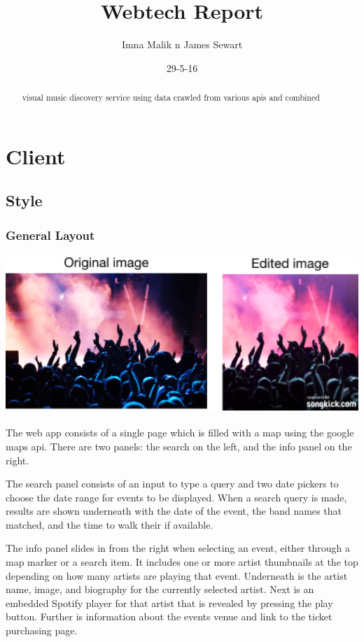 \documentclass[10pt]{article}
\title{Webtech Report}
\author{Imna Malik n James Sewart}
\date{29-5-16}
\begin{document}
    \maketitle

    \tableofcontents


    \begin{abstract}
        visual music discovery service using data crawled from various apis and combined
    \end{abstract}

    \section{Client}
        \subsection{Style}
            \subsubsection{General Layout}
                \includegraphics[height=60mm]{example2.png}

                The web app consists of a single page which is filled with a map using the google maps api. There are two panels: the search on the left, and the info panel on the right. 

                The search panel consists of an input to type a query and two date pickers to choose the date range for events to be displayed. When a search query is made, results are shown underneath with the date of the event, the band names that matched, and the time to walk their if available.

                The info panel slides in from the right when selecting an event, either through a map marker or a search item. It includes one or more artist thumbnails at the top depending on how many artists are playing that event. Underneath is the artist name, image, and biography for the currently selected artist. Next is an embedded Spotify player for that artist that is revealed by pressing the play button. Further is information about the events venue and link to the ticket purchasing page.
\end{document}
